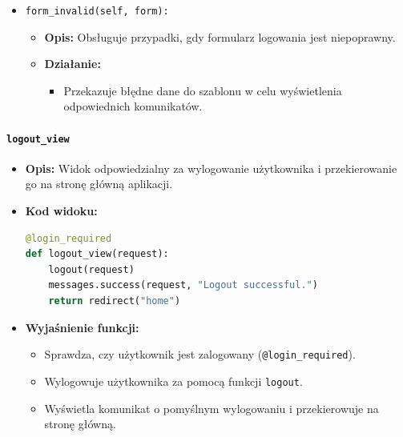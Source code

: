 \documentclass[12pt,a4paper,oneside]{article}
\theoremstyle{definition}
\numberwithin{equation}{section}
\begin{document}
\begin{itemize}
\begin{itemize}
        \item \texttt{form\_invalid(self, form):}
        \begin{itemize}
            \item \textbf{Opis:} Obsługuje przypadki, gdy formularz logowania jest niepoprawny.
            \item \textbf{Działanie:}
            \begin{itemize}
                \item Przekazuje błędne dane do szablonu w celu wyświetlenia odpowiednich komunikatów.
            \end{itemize}
        \end{itemize}
    \end{itemize}
\end{itemize}

\paragraph{\texttt{logout\_view}}
\begin{itemize}
    \item \textbf{Opis:} Widok odpowiedzialny za wylogowanie użytkownika i przekierowanie go na stronę główną aplikacji.
    \item \textbf{Kod widoku:}
    \begin{lstlisting}[language=Python, caption=Widok \texttt{logout\_view}]
@login_required
def logout_view(request):
    logout(request)
    messages.success(request, "Logout successful.")
    return redirect("home")
    \end{lstlisting}

    \item \textbf{Wyjaśnienie funkcji:}
    \begin{itemize}
        \item Sprawdza, czy użytkownik jest zalogowany (\texttt{@login\_required}).
        \item Wylogowuje użytkownika za pomocą funkcji \texttt{logout}.
        \item Wyświetla komunikat o pomyślnym wylogowaniu i przekierowuje na stronę główną.
    \end{itemize}
\end{itemize}
\end{document}
